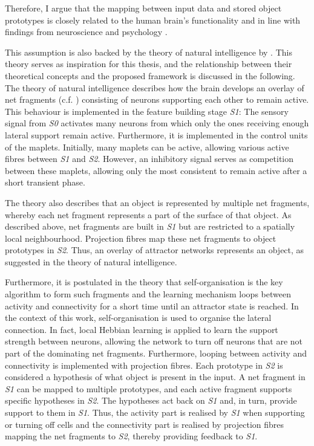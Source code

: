 Therefore, I argue that the mapping between input data and stored object prototypes is closely related to the human brain's functionality and in line with findings from neuroscience \cite{kandel_principles_2013, olshausen_emergence_1996, vogels_inhibitory_2011, payeur_burst-dependent_2021} and psychology \cite{ellis_source_1938, kohler_gestalt_1992, wagemans_century_2012, hamlyn_psychology_2017}.

This assumption is also backed by the theory of natural intelligence by .
This theory serves as inspiration for this thesis, and the relationship between their theoretical concepts and the proposed framework is discussed in the following.
The theory of natural intelligence describes how the brain develops an overlay of net fragments (c.f. ) consisting of neurons supporting each other to remain active.
This behaviour is implemented in the feature building stage \emph{S1}: The sensory signal from \emph{S0} activates many neurons from which only the ones receiving enough lateral support remain active. Furthermore, it is implemented in the control units of the maplets. Initially, many maplets can be active, allowing various active fibres between \emph{S1} and \emph{S2}. However, an inhibitory signal serves as competition between these maplets, allowing only the most consistent to remain active after a short transient phase.

The theory also describes that an object is represented by multiple net fragments, whereby each net fragment represents a part of the surface of that object.
As described above, net fragments are built in \emph{S1} but are restricted to a spatially local neighbourhood. Projection fibres map these net fragments to object prototypes in \emph{S2}. Thus, an overlay of attractor networks represents an object, as suggested in the theory of natural intelligence.

Furthermore, it is postulated in the theory that self-organisation is the key algorithm to form such fragments and the learning mechanism loops between activity and connectivity for a short time until an attractor state is reached.
In the context of this work, self-organisation is used to organise the lateral connection. In fact, local Hebbian learning is applied to learn the support strength between neurons, allowing the network to turn off neurons that are not part of the dominating net fragments.
Furthermore, looping between activity and connectivity is implemented with projection fibres. 
Each prototype in \emph{S2} is considered a hypothesis of what object is present in the input. A net fragment in \emph{S1} can be mapped to multiple prototypes, and each active fragment supports specific hypotheses in \emph{S2}. The hypotheses act back on \emph{S1} and, in turn, provide support to them in \emph{S1}. Thus, the activity part is realised by \emph{S1} when supporting or turning off cells and the connectivity part is realised by projection fibres mapping the net fragments to \emph{S2}, thereby providing feedback to \emph{S1}.

